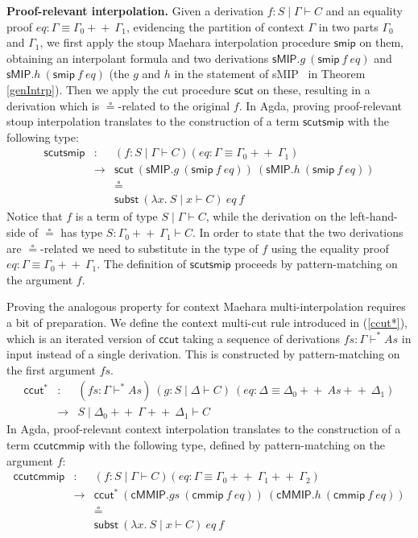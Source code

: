 \documentclass[sn-mathphys-num]{sn-jnl}%
\newcommand{\GG}{\Gamma}
\newcommand{\GD}{\Delta}
\newcommand{\vd}{\vdash}
\newcommand{\sMIP}{\textsf{sMIP}}
\newcommand{\cMMIP}{\textsf{cMMIP}}
\newcommand{\append}{+\!\!+}
\theoremstyle{thmstyleone}%
\theoremstyle{thmstyletwo}%
\theoremstyle{thmstylethree}%
\begin{document}
\noindent\textbf{Proof-relevant interpolation.}
Given a derivation $f : S \mid \GG \vdash C$ and an equality proof $eq : \GG \equiv \GG_0 \append~\GG_1$, evidencing the partition of context $\GG$ in two parts $\GG_0$ and $\GG_1$, we first apply the stoup Maehara interpolation procedure $\mathsf{smip}$ on them, obtaining an interpolant formula and two derivations $\sMIP.g ~(\mathsf{smip} ~f ~eq)$ and $\sMIP.h ~(\mathsf{smip} ~f ~eq)$ (the $g$ and $h$ in the statement of \sMIP~ in Theorem \ref{genIntrp}). Then we apply the cut procedure $\mathsf{scut}$ on these, resulting in a derivation which is $\circeq$-related to the original $f$. In Agda, proving proof-relevant stoup interpolation translates to the construction of a term $\mathsf{scutsmip}$ with the following type:
\[
\begin{array}{rcl}
\mathsf{scutsmip} & : & (f : S \mid \GG \vdash C)
 (eq : \GG \equiv \GG_0 \append~\GG_1) \\
&\to &  \mathsf{scut} ~(\sMIP.g ~(\mathsf{smip} ~f ~eq)) ~(\sMIP.h ~(\mathsf{smip} ~f ~eq)) \\
&& \circeq \\
&&\mathsf{subst} ~(\lambda x.~S \mid x \vdash C) ~eq ~f
\end{array}
\]
Notice that $f$ is a term of type $S \mid \GG \vdash C$, while the derivation on the left-hand-side of $\circeq$ has type $S : \GG_0 \append ~\GG_1 \vdash C$. In order to state that the two derivations are $\circeq$-related we need to substitute in the type of $f$ using the equality proof $eq : \GG \equiv \GG_0 \append~\GG_1$.
The definition of $\mathsf{scutsmip}$ proceeds by pattern-matching on the argument $f$.

Proving the analogous property for context Maehara multi-interpolation requires a bit of preparation.
We define the context multi-cut rule introduced in (\ref{ccut*}), which is an iterated version of $\mathsf{ccut}$ taking a sequence of derivations $fs : \GG \vd^* As$ in input instead of a single derivation.
This is constructed by pattern-matching on the first argument $fs$.
\[
\begin{array}{rcl}
  \mathsf{ccut^*} &:& (fs : \GG \vd^* As)
  ~(g : S \mid \GD \vd C)
  ~(eq : \GD \equiv \GD_0 \append ~As \append ~\GD_1) \\
  &\to& S \mid \GD_0 \append ~\GG \append ~\GD_1 \vd C
\end{array}
\]
In Agda, proof-relevant context interpolation translates to the construction of a term $\mathsf{ccutcmmip}$ with the following type, defined by pattern-matching on the argument $f$:
\[
\begin{array}{rcl}
\mathsf{ccutcmmip} & : & (f : S \mid \GG \vdash C)
 (eq : \GG \equiv \GG_0 \append~\GG_1 \append~\GG_2) \\
&\to &  \mathsf{ccut^*} ~(\cMMIP.gs ~(\mathsf{cmmip} ~f ~eq)) ~(\cMMIP.h ~(\mathsf{cmmip} ~f ~eq)) \\
&& \circeq \\
&&\mathsf{subst} ~(\lambda x.~S \mid x \vdash C) ~eq ~f
\end{array}
\]
\end{document}
